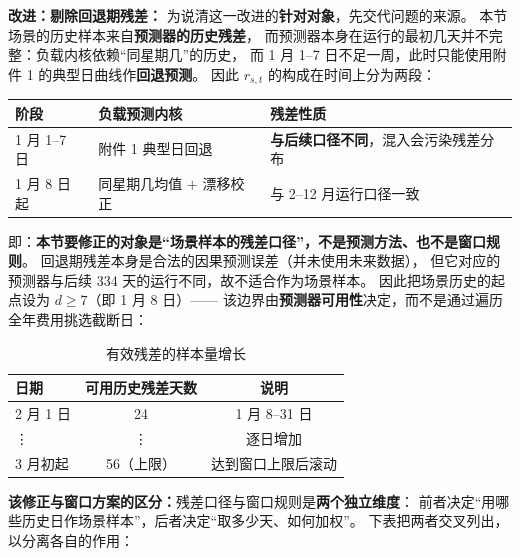 \noindent\textbf{改进：剔除回退期残差：}
为说清这一改进的\textbf{针对对象}，先交代问题的来源。
本节场景的历史样本来自\textbf{预测器的历史残差}，
而预测器本身在运行的最初几天并不完整：负载内核依赖“同星期几”的历史，
而 1 月 1--7 日不足一周，此时只能使用附件 1 的典型日曲线作\textbf{回退预测}。
因此 $r_{s,t}$ 的构成在时间上分为两段：

\begin{center}
\begin{tabular}{@{}l l l@{}}
\toprule
阶段 & 负载预测内核 & 残差性质 \\
\midrule
1 月 1--7 日 & 附件 1 典型日回退 & \textbf{与后续口径不同}，混入会污染残差分布 \\
1 月 8 日起  & 同星期几均值 $+$ 漂移校正 & 与 2--12 月运行口径一致 \\
\bottomrule
\end{tabular}
\end{center}

即：\textbf{本节要修正的对象是“场景样本的残差口径”，不是预测方法、也不是窗口规则}。
回退期残差本身是合法的因果预测误差（并未使用未来数据），
但它对应的预测器与后续 334 天的运行不同，故不适合作为场景样本。
因此把场景历史的起点设为 $d\ge 7$（即 1 月 8 日）——
该边界由\textbf{预测器可用性}决定，而不是通过遍历全年费用挑选截断日：

\begin{table}[H]
\centering
\caption{有效残差的样本量增长}
\begin{tabular}{@{}l c c@{}}
\toprule
日期 & 可用历史残差天数 & 说明 \\
\midrule
2 月 1 日 & 24 & 1 月 8--31 日 \\
\vdots & \vdots & 逐日增加 \\
3 月初起 & 56（上限） & 达到窗口上限后滚动 \\
\bottomrule
\end{tabular}
\end{table}

\noindent\textbf{该修正与窗口方案的区分：}残差口径与窗口规则是\textbf{两个独立维度}：
前者决定“用哪些历史日作场景样本”，后者决定“取多少天、如何加权”。
下表把两者交叉列出，以分离各自的作用：

